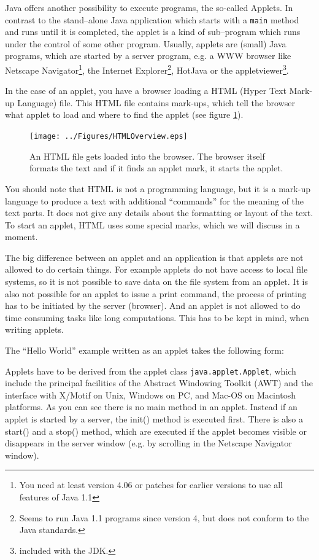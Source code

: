 Java offers another possibility to execute programs, the so-called Applets.
In contrast to the stand--alone Java application which starts with a
\verb!main! method and runs until it is completed, the applet is a kind of
sub--program which runs under the control of some other program.
Usually, applets are (small) Java programs, which are started by a 
server program,
e.g. a WWW browser like Netscape Navigator\footnote{You need at least 
version 4.06 or patches for earlier versions to use all features of Java 1.1}, 
the Internet Explorer\footnote{Seems to run Java 1.1 programs since
version 4, but does not conform to the Java standards.},
HotJava or the appletviewer\footnote{included with the JDK.}.

In the case of an applet, you have a browser loading a HTML 
(Hyper Text Mark-up Language) file. This HTML file contains
mark-ups, which tell the browser what applet to load and
where to find the applet (see figure \ref{fig:HTMLOverview}). 
\begin{figure}[htbp]
  \begin{center}
    \texttt{[image: ../Figures/HTMLOverview.eps]}
    \caption{An HTML file gets loaded into the browser. The browser itself formats the text and if it finds an applet mark, it starts the applet.}
    \label{fig:HTMLOverview}
  \end{center}
\end{figure}
You should note that HTML is not a programming language, but
it is a mark-up language to produce a text with additional
``commands'' for the meaning of the text parts. It does
not give any details about the formatting or layout of the
text. To start an applet, HTML uses some special marks, which we
will discuss in a moment.  

The big difference between an applet and an application is that
applets are not allowed to do certain things. For example applets
do not have access to local file systems, so it is not possible
to save data on the file system from an applet. It is also not
possible for an applet to issue a print command, the process of
printing has to be initiated by the server (browser). 
And an applet is not allowed to do time consuming tasks like
long computations. This has to be kept in mind, when writing
applets.


The ``Hello World'' example written as an applet takes the following form:


Applets have to be derived from the applet class
\verb|java.applet.Applet|, which include the principal facilities of
the Abstract Windowing Toolkit (AWT) and the interface with X/Motif on
Unix, Windows on PC, and Mac-OS on Macintosh platforms.
As you can see there is no main method in an applet. Instead if an applet
is started by a server, the init() method is executed first. There is also
a start() and a stop() method, which are executed if the applet becomes
visible or disappears in the server window (e.g. by scrolling in the
Netscape Navigator window).

